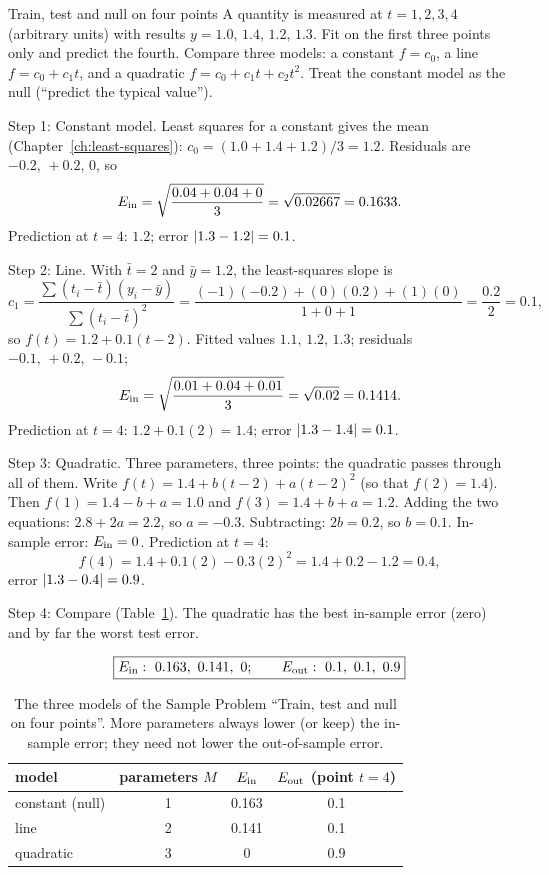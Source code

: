 \begin{sample}{Train, test and null on four points}
A quantity is measured at $t=1,2,3,4$ (arbitrary units) with results $y=1.0,\,1.4,\,1.2,\,1.3$. Fit on the first three points only and predict the fourth. Compare three models: a constant $f=c_0$, a line $f=c_0+c_1t$, and a quadratic $f=c_0+c_1t+c_2t^2$. Treat the constant model as the null (``predict the typical value'').

Step 1: Constant model. Least squares for a constant gives the mean (Chapter~\ref{ch:least-squares}): $c_0=(1.0+1.4+1.2)/3=1.2$. Residuals are $-0.2,\,+0.2,\,0$, so
\[
E_{\rm in}=\sqrt{\frac{0.04+0.04+0}{3}}=\sqrt{0.02667}=0.1633.
\]
Prediction at $t=4$: $1.2$; error $\left\lvert 1.3-1.2\right\rvert=0.1$.

Step 2: Line. With $\bar t=2$ and $\bar y=1.2$, the least-squares slope is
\[
c_1=\frac{\sum(t_i-\bar t)(y_i-\bar y)}{\sum(t_i-\bar t)^2}=\frac{(-1)(-0.2)+(0)(0.2)+(1)(0)}{1+0+1}=\frac{0.2}{2}=0.1,
\]
so $f(t)=1.2+0.1(t-2)$. Fitted values $1.1,\,1.2,\,1.3$; residuals $-0.1,\,+0.2,\,-0.1$;
\[
E_{\rm in}=\sqrt{\frac{0.01+0.04+0.01}{3}}=\sqrt{0.02}=0.1414.
\]
Prediction at $t=4$: $1.2+0.1(2)=1.4$; error $\left\lvert 1.3-1.4\right\rvert=0.1$.

Step 3: Quadratic. Three parameters, three points: the quadratic passes through all of them. Write $f(t)=1.4+b(t-2)+a(t-2)^2$ (so that $f(2)=1.4$). Then $f(1)=1.4-b+a=1.0$ and $f(3)=1.4+b+a=1.2$. Adding the two equations: $2.8+2a=2.2$, so $a=-0.3$. Subtracting: $2b=0.2$, so $b=0.1$. In-sample error: $E_{\rm in}=0$. Prediction at $t=4$:
\[
f(4)=1.4+0.1(2)-0.3(2)^2=1.4+0.2-1.2=0.4,
\]
error $\left\lvert 1.3-0.4\right\rvert=0.9$.

Step 4: Compare (Table~\ref{tab:generalization-four}). The quadratic has the best in-sample error (zero) and by far the worst test error.

\[
\boxed{E_{\rm in}:\ 0.163,\ 0.141,\ 0;\qquad E_{\rm out}:\ 0.1,\ 0.1,\ 0.9}
\]
\end{sample}

\begin{table}[htbp]\centering
\caption{The three models of the Sample Problem ``Train, test and null on four points''. More parameters always lower (or keep) the in-sample error; they need not lower the out-of-sample error.}
\label{tab:generalization-four}
\begin{tabular}{lccc}
\toprule
model & parameters $M$ & $E_{\rm in}$ & $E_{\rm out}$ (point $t=4$) \\
\midrule
constant (null) & 1 & 0.163 & 0.1 \\
line & 2 & 0.141 & 0.1 \\
quadratic & 3 & 0 & 0.9 \\
\bottomrule
\end{tabular}
\end{table}

